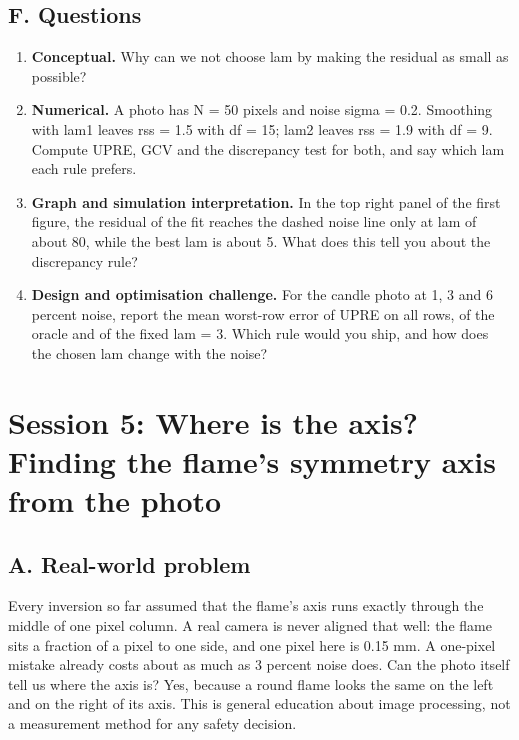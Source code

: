 \documentclass[11pt,a4paper]{article}
\begin{document}
\subsection*{F. Questions}
\begin{enumerate}[nosep]
\item \textbf{Conceptual.} Why can we not choose lam by making the residual as small as possible?
\item \textbf{Numerical.} A photo has N = 50 pixels and noise sigma = 0.2. Smoothing with lam1 leaves rss = 1.5 with df = 15; lam2 leaves rss = 1.9 with df = 9. Compute UPRE, GCV and the discrepancy test for both, and say which lam each rule prefers.
\item \textbf{Graph and simulation interpretation.} In the top right panel of the first figure, the residual of the fit reaches the dashed noise line only at lam of about 80, while the best lam is about 5. What does this tell you about the discrepancy rule?
\item \textbf{Design and optimisation challenge.} For the candle photo at 1, 3 and 6 percent noise, report the mean worst-row error of UPRE on all rows, of the oracle and of the fixed lam = 3. Which rule would you ship, and how does the chosen lam change with the noise?
\end{enumerate}

\section{Session 5: Where is the axis? Finding the flame's symmetry axis from the photo}

\subsection*{A. Real-world problem}
Every inversion so far assumed that the flame's axis runs exactly through the middle of one pixel column. A real camera is never aligned that well: the flame sits a fraction of a pixel to one side, and one pixel here is 0.15 mm. A one-pixel mistake already costs about as much as 3 percent noise does. Can the photo itself tell us where the axis is? Yes, because a round flame looks the same on the left and on the right of its axis. This is general education about image processing, not a measurement method for any safety decision.
\end{document}
